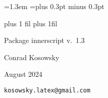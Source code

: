 \def\packageversion{1.3}
\def\packagedate{August 2024}

\MacroIndent=1.3em
\def\scalemu#1#2{\muexpr#2#1
  \@plus\muexpr#2\gluetomu\gluestretch\mutoglue#1\relax
  \@minus\muexpr#2\gluetomu\glueshrink\mutoglue#1\relax\relax}
\baselineskip=\the\baselineskip plus 0.3pt minus 0.3pt\relax

\let\@@section\section
\def\section{\@ifstar\star@sect\no@star@sect}
\def\star@sect#1{\sectionhook{#1}\@@section*{#1}}
\def\no@star@sect#1{\sectionhook{#1}\@@section{#1}}

\def\sectionhook#1{%
  \ifdim\dimexpr\pagegoal-\pagetotal-3pt\relax<6\bigskipamount
    \vfill\eject
  \fi
  \def\sectionname{#1}}

\def\@oddhead{%
  \ifnum\count0>1\relax
    \ifodd\c@page
      \rlap{\textit{\sectionname}}\hfil
      \hbox to 0pt{\hss\documentname\hss}\hfil
      \llap{\the\count0}%
    \else
      \rlap{\the\count0}\hfil
      \hbox to 0pt{\hss\documentname\hss}\hfil
      \llap{\textit{\sectionname}}%
    \fi
  \fi}
\def\@oddfoot{\hfil\ifnum\count0=1\relax1\fi\hfil}


\let\code\@undefined
\let\endcode\@undefined
\newenvironment{code}
 {\strut\vadjust\bgroup\medskip\parindent\z@\leftskip=4em\relax
   \noindent\strut\ignorespaces}
 {\strut\par\medskip\egroup\hfill\break\strut\ignorespacesafterend}
\def\argtext#1{\ensuremath{\langle$\textit{#1}$\rangle}}
\def\vrb#1{\expandafter\texttt\expandafter{\string#1}}
\def\clap@math#1{\hb@xt@\z@{\hss$\displaystyle#1$\hss}}

{\large
\parindent=0pt
\leftskip=0pt plus 1 fil
\rightskip=0pt plus 1fil
\parfillskip=0pt
{\strut\Large Package \textsf{innerscript} v.\ \packageversion\ \documentname}\par
\strut Conrad Kosowsky\par
\strut \packagedate\par
\strut\texttt{kosowsky.latex@gmail.com}\par}

